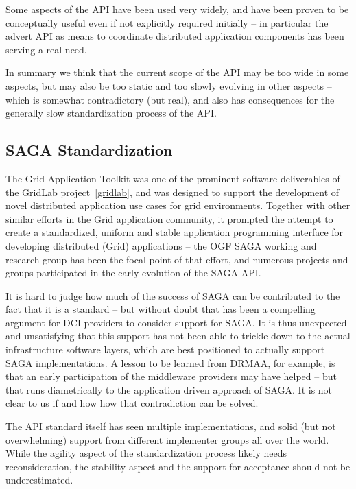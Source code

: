 \documentclass{article}
\begin{document}
  Some aspects of the API have been used very widely, and have been
  proven to be conceptually useful even if not explicitly required
  initially -- in particular the advert API as means to coordinate
  distributed application components has been serving a real need.

  In summary we think that the current scope of the API may be too
  wide in some aspects, but may also be too static and too slowly
  evolving in other aspects -- which is somewhat contradictory (but
  real), and also has consequences for the generally slow
  standardization process of the API.

 \subsection{SAGA Standardization}

  The Grid Application Toolkit was one of the prominent software
  deliverables of the GridLab project~\ref{gridlab}, and was designed
  to support the development of novel distributed application use
  cases for grid environments.  Together with other similar efforts in
  the Grid application community, it prompted the attempt to create
  a standardized, uniform and stable application programming interface
  for developing distributed (Grid) applications -- the OGF SAGA
  working and research group has been the focal point of that effort,
  and numerous projects and groups participated in the early
  evolution of the SAGA API.  

  It is hard to judge how much of the success of SAGA can be
  contributed to the fact that it is a standard -- but without doubt
  that has been a compelling argument for DCI providers to consider
  support for SAGA.  It is thus unexpected and unsatisfying that this
  support has not been able to trickle down to the actual
  infrastructure software layers, which are best positioned to
  actually support SAGA implementations.  A lesson to be learned from
  DRMAA, for example, is that an early participation of the middleware
  providers may have helped -- but that runs diametrically to the
  application driven approach of SAGA.  It is not clear to us if and
  how how that contradiction can be solved.

  The API standard itself has seen multiple implementations, and solid
  (but not overwhelming) support from different implementer groups all
  over the world.  While the agility aspect of the standardization
  process likely needs reconsideration, the stability aspect and the
  support for acceptance should not be underestimated.
\end{document}

